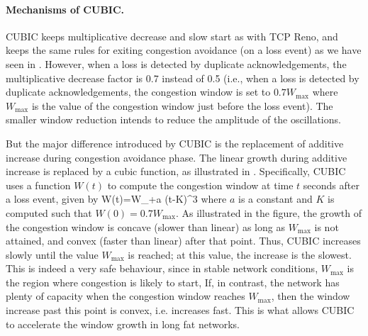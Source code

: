 \paragraph{Mechanisms of CUBIC.} CUBIC keeps multiplicative decrease and slow start as
with TCP Reno, and keeps the same rules for exiting congestion avoidance (on a loss event) as we have seen in . However, when a loss is detected by duplicate acknowledgements, the multiplicative decrease factor is 0.7 instead of 0.5 (i.e., when a loss is detected by duplicate acknowledgements, the congestion window is set to $0.7 W_{\max}$ where $W_{\max}$ is the value of the congestion window just before the loss event). The smaller window reduction intends to reduce the amplitude of the oscillations.
 \begin{figure}[h]
        \protect\label{fig-cubic1}
\end{figure}

But the major difference introduced by CUBIC is the replacement of additive increase during congestion avoidance phase.
The linear growth during additive increase is replaced by a cubic function, as illustrated in . Specifically, CUBIC uses a function $W(t)$ to compute the congestion window at time $t$ seconds after a loss event, given by
\be
W(t)=W_{\max}+a (t-K)^3
\ee where $a$ is a constant and $K$ is computed such that $W(0)=0.7 W_{\max}$. As illustrated in the figure, the growth of the congestion window is concave (slower than linear) as long as $W_{\max}$ is not attained, and convex (faster than linear) after that point. Thus, CUBIC increases slowly until the value $W_{\max}$ is reached; at this value, the increase is the slowest. This is indeed a very safe behaviour, since in stable network conditions, $W_{\max}$ is the region where congestion is likely to start, If, in contrast, the network has plenty of capacity when the congestion window reaches $W_{\max}$, then the window increase past this point is convex, i.e. increases fast. This is what allows CUBIC to accelerate the window growth in long fat networks.


